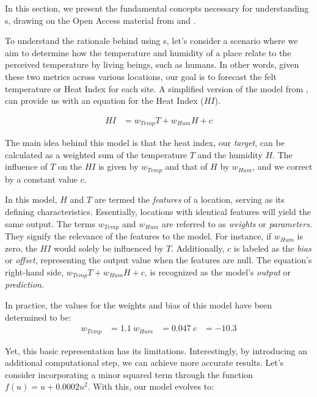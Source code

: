 \label{02_neural_networks}




In this section, we present the fundamental concepts necessary for understanding \neuralNetwork{}s, drawing on the Open Access material from  and .

\label{02_nn_motivating_example}


To understand the rationale behind using \neuralNetwork{}s, let's consider a scenario where we aim to determine how the temperature and humidity of a place relate to the perceived temperature by living beings, such as humans. In other words, given these two metrics across various locations, our goal is to forecast the felt temperature or Heat Index for each site. A simplified version of the model from , can provide us with an equation for the Heat Index ($HI$).

\begin{align*}
    HI &= w_{Temp} T + w_{Hum} H + c
\end{align*}


The main idea behind this model is that the heat index, our \emph{target}, can be calculated as a weighted sum of the temperature $T$ and the humidity $H$. The influence of $T$ on the $HI$ is given by $w_{Temp}$ and that of $H$ by $w_{Hum}$, and we correct by a constant value $c$. 

In this model, $H$ and $T$ are termed the \emph{features} of a location, serving as its defining characteristics. Essentially, locations with identical features will yield the same output. The terms $w_{Temp}$ and $w_{Hum}$ are referred to as \emph{weights} or \emph{parameters}. They signify the relevance of the features to the model. For instance, if $w_{Hum}$ is zero, the $HI$ would solely be influenced by $T$. Additionally, $c$ is labeled as the \emph{bias} or \emph{offset}, representing the output value when the features are null. The equation's right-hand side, $w_{Temp} T + w_{Hum} H + c$, is recognized as the model's \emph{output} or \emph{prediction}.


In practice, the values for the weights and bias of this model have been determined to be:
\begin{align*}
w_{Temp} & = 1.1\
w_{Hum} &= 0.047 \
c &= -10.3
\end{align*}

Yet, this basic representation has its limitations. Interestingly, by introducing an additional computational step, we can achieve more accurate results. Let's consider incorporating a minor squared term through the function $f(u) = u + 0.0002 u^2$. With this, our model evolves to:

